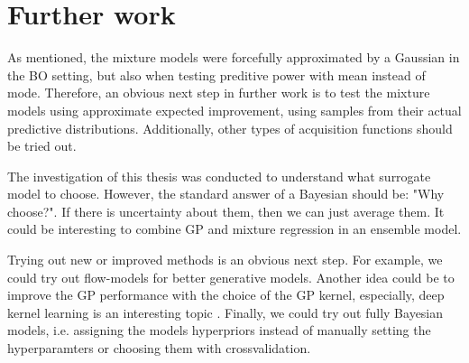 



\section{Further work}
As mentioned, the mixture models were forcefully approximated by a Gaussian in the BO setting, but
also when testing preditive power with mean instead of mode. Therefore, an obvious next step in
further work is to test the mixture models using approximate expected improvement, using samples
from their actual predictive distributions. Additionally, other types of acquisition functions
should be tried out. 

The investigation of this thesis was conducted to understand what surrogate model to choose.
However, the standard answer of a Bayesian should be: "Why choose?". If there is uncertainty about
them, then we can just average them. It could be interesting to combine GP and mixture regression in 
an ensemble model.

Trying out new or improved methods is an obvious next step. For example, we could try out
flow-models for better generative models. Another idea could be to improve the GP performance with
the choice of the GP kernel, especially, deep kernel learning is an interesting topic
\cite{DeepKernelLearning}. Finally, we could try out fully Bayesian models, i.e. assigning the
models hyperpriors instead of manually setting the hyperparamters or choosing them with crossvalidation. 

